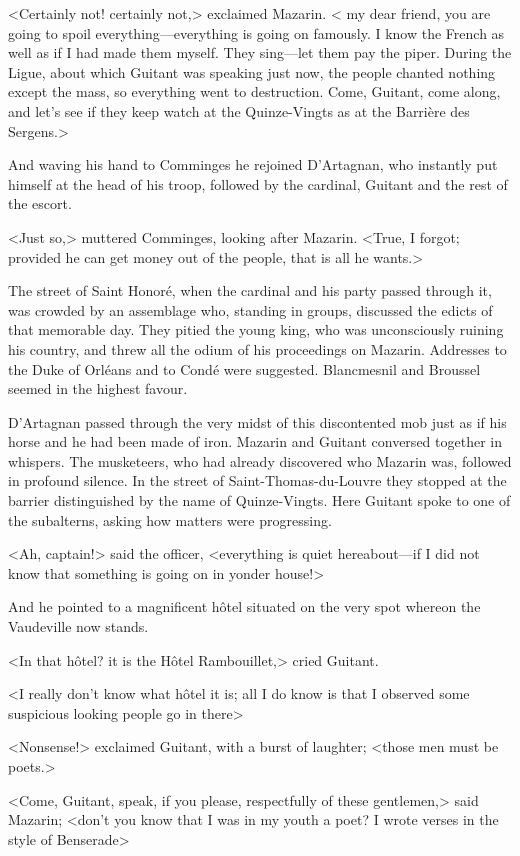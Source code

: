 <Certainly not! certainly not,> exclaimed Mazarin. < my dear friend, you are going to spoil everything—everything is going on famously. I know the French as well as if I had made them myself. They sing—let them pay the piper. During the Ligue, about which Guitant was speaking just now, the people chanted nothing except the mass, so everything went to destruction. Come, Guitant, come along, and let's see if they keep watch at the Quinze-Vingts as at the Barrière des Sergens.>

And waving his hand to Comminges he rejoined D'Artagnan, who instantly put himself at the head of his troop, followed by the cardinal, Guitant and the rest of the escort.

<Just so,> muttered Comminges, looking after Mazarin. <True, I forgot; provided he can get money out of the people, that is all he wants.>

The street of Saint Honoré, when the cardinal and his party passed through it, was crowded by an assemblage who, standing in groups, discussed the edicts of that memorable day. They pitied the young king, who was unconsciously ruining his country, and threw all the odium of his proceedings on Mazarin. Addresses to the Duke of Orléans and to Condé were suggested. Blancmesnil and Broussel seemed in the highest favour.

D'Artagnan passed through the very midst of this discontented mob just as if his horse and he had been made of iron. Mazarin and Guitant conversed together in whispers. The musketeers, who had already discovered who Mazarin was, followed in profound silence. In the street of Saint-Thomas-du-Louvre they stopped at the barrier distinguished by the name of Quinze-Vingts. Here Guitant spoke to one of the subalterns, asking how matters were progressing.

<Ah, captain!> said the officer, <everything is quiet hereabout—if I did not know that something is going on in yonder house!>

And he pointed to a magnificent hôtel situated on the very spot whereon the Vaudeville now stands.

<In that hôtel? it is the Hôtel Rambouillet,> cried Guitant.

<I really don't know what hôtel it is; all I do know is that I observed some suspicious looking people go in there\longdash>

<Nonsense!> exclaimed Guitant, with a burst of laughter; <those men must be poets.>

<Come, Guitant, speak, if you please, respectfully of these gentlemen,> said Mazarin; <don't you know that I was in my youth a poet? I wrote verses in the style of Benserade\longdash>

